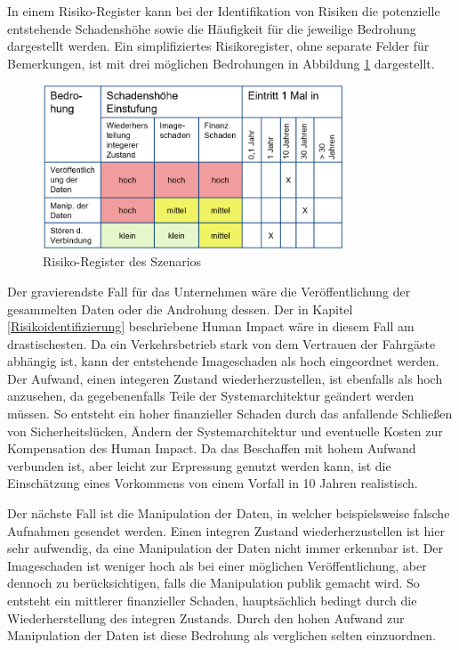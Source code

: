 In einem \glqq{}Risiko-Register\grqq{} kann bei der Identifikation von Risiken die potenzielle entstehende Schadenshöhe sowie die Häufigkeit für die jeweilige Bedrohung dargestellt werden\cite{Königs2017}.
Ein simplifiziertes Risikoregister, ohne separate Felder für Bemerkungen, ist mit drei möglichen Bedrohungen in Abbildung \ref{fig:riskreg} dargestellt.

\begin{figure}[ht]
      \begin{center}
            \includegraphics[width= 0.8\textwidth]{Bilder/risikoregister.png}
            \caption{Risiko-Register des Szenarios}
            \label{fig:riskreg}
      \end{center}
\end{figure}


Der gravierendste Fall für das Unternehmen wäre die Veröffentlichung der gesammelten Daten oder die Androhung dessen. Der in Kapitel \ref{Risikoidentifizierung} beschriebene \glqq{}Human Impact\grqq{} wäre
in diesem Fall am drastischesten. Da ein Verkehrsbetrieb stark von dem Vertrauen der Fahrgäste abhängig ist, kann der entstehende Imageschaden als hoch eingeordnet werden. Der Aufwand, einen
integeren Zustand wiederherzustellen, ist ebenfalls als hoch anzusehen, da gegebenenfalls Teile der Systemarchitektur geändert werden müssen. So entsteht ein hoher finanzieller Schaden durch das anfallende Schließen
von Sicherheitslücken, Ändern der Systemarchitektur und eventuelle Kosten zur Kompensation des Human Impact. Da das Beschaffen mit hohem Aufwand verbunden ist, aber leicht zur Erpressung genutzt werden kann,
ist die Einschätzung eines Vorkommens von einem Vorfall in 10 Jahren realistisch.


Der nächste Fall ist die Manipulation der Daten, in welcher beispielsweise falsche Aufnahmen gesendet werden. Einen integren Zustand wiederherzustellen ist hier sehr aufwendig, da eine Manipulation der Daten
nicht immer erkennbar ist. Der Imageschaden ist weniger hoch als bei einer möglichen Veröffentlichung, aber dennoch zu berücksichtigen, falls die Manipulation publik gemacht wird. So entsteht ein mittlerer
finanzieller Schaden, hauptsächlich bedingt durch die Wiederherstellung des integren Zustands. Durch den hohen Aufwand zur Manipulation der Daten ist diese Bedrohung als verglichen selten einzuordnen.


